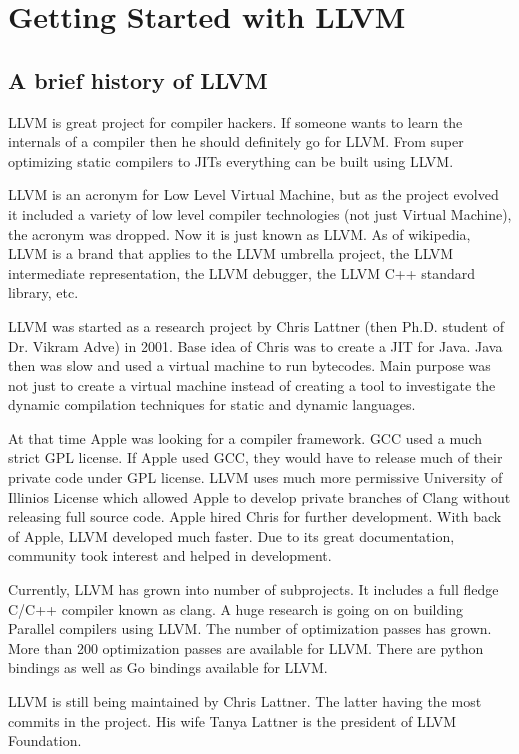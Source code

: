 \section{Getting Started with LLVM}

\subsection{A brief history of LLVM}
LLVM is great project for compiler hackers. If someone wants to learn the internals
of a compiler then he should definitely go for LLVM. From super optimizing static
compilers to JITs everything can be built using LLVM.

LLVM is an acronym for Low Level Virtual Machine, but as the project evolved it
included a variety of low level compiler technologies (not just Virtual Machine),
the acronym was dropped. Now it is just known as LLVM. As of wikipedia, LLVM is a
brand that applies to the LLVM umbrella project, the LLVM intermediate representation,
the LLVM debugger, the LLVM C++ standard library, etc.

LLVM was started as a research project by Chris Lattner (then Ph.D. student
of Dr. Vikram Adve) in 2001. Base idea of Chris was to create a JIT for Java. Java then
was slow and used a virtual machine to run bytecodes. Main purpose was not just to
create a virtual machine instead of creating a tool to investigate the dynamic
compilation techniques for static and dynamic languages.

At that time Apple was looking for a compiler framework. GCC used a much strict
GPL license. If Apple used GCC, they would have to release much of their private
code under GPL license. LLVM uses much more permissive University of Illinios License
which allowed Apple to develop private branches of Clang without releasing full source code.
Apple hired Chris for further development. With back of Apple, LLVM developed much faster.
Due to its great documentation, community took interest and helped in development.

Currently, LLVM has grown into number of subprojects. It includes a full fledge C/C++ compiler
known as clang. A huge research is going on on building Parallel compilers using LLVM. The
number of optimization passes has grown. More than 200 optimization passes are available for LLVM.
There are python bindings as well as Go bindings available for LLVM.

LLVM is still being maintained by Chris Lattner. The latter having the most commits in the project.
His wife Tanya Lattner is the president of LLVM Foundation.

